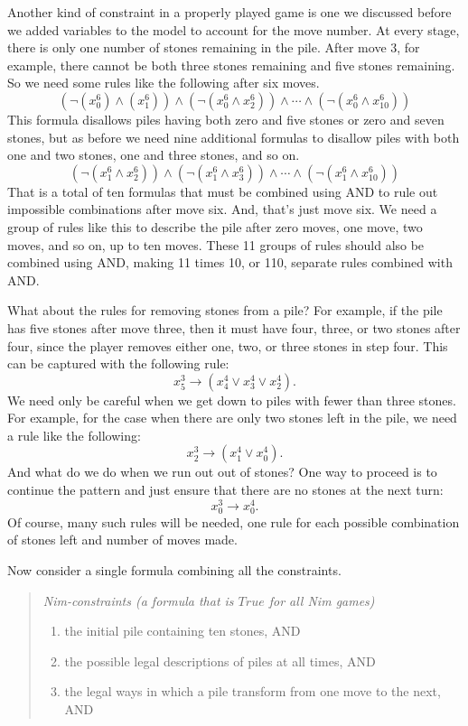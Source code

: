 {Another kind of constraint in a properly played game is one
we discussed before we added variables to the model to account for the move number.
At every stage, there is only one number of stones remaining in the pile.
After move 3, for example, there cannot be both three stones remaining
and five stones remaining.
So we need some rules like the following after six moves.
$$(\neg(x_{0}^{6}) \wedge (x_{1}^{6})) \wedge (\neg(x_{0}^{6} \wedge x_{2}^{6})) \wedge \cdots \wedge (\neg(x_{0}^{6} \wedge x_{10}^{6}))$$
This formula disallows piles having both zero and five stones or zero and seven stones,
but as before we need nine additional
formulas to disallow piles with both one and two stones, one and three stones, and so on.
$$(\neg(x_{1}^{6} \wedge x_{2}^{6})) \wedge (\neg(x_{1}^{6} \wedge x_{3}^{6})) \wedge \cdots \wedge (\neg(x_{1}^{6} \wedge x_{10}^{6}))$$
That is a total of ten formulas that must be combined using AND
to rule out impossible combinations after move six.
And, that's just move six.
We need a group of rules like this to describe the pile after zero moves,
one move, two moves, and so on, up to ten moves.
These 11 groups of rules should also be combined using AND,
making 11 times 10, or 110, separate rules combined with AND.

What about the rules for removing stones from a pile?
For example, if the pile has five stones after move three,
then it must have four, three, or two stones after four,
since the player removes either one, two, or three stones in step four.
This can
be captured with the following rule:
$$x_{5}^{3} \rightarrow (x_{4}^{4} \vee x_{3}^{4} \vee x_{2}^{4}).$$
We need only be careful when we get down to piles with fewer than three stones. For example, for the case when there are only
two stones left in the pile, we need a rule like the following:
$$x_{2}^{3} \rightarrow (x_{1}^{4} \vee x_{0}^{4}).$$
And what do we do when we run out out of stones?
One way to proceed is to continue the pattern
and just ensure that there are no stones at the next turn:
$$x_{0}^{3} \rightarrow x_{0}^{4}.$$
Of course, many such rules will be needed,
one rule for each possible combination of stones left and number of moves made.

Now consider a single formula combining all the constraints.
\begin{quote}
\begin{center}
\emph{Nim-constraints (a formula that is $True$ for all Nim games)}
\end{center}
\begin{enumerate}
\item the initial pile containing ten stones, AND
\item the possible legal descriptions of piles at all times, AND
\item the legal ways in which a pile transform from one move to the next, AND
\end{enumerate}
\end{quote}

}
